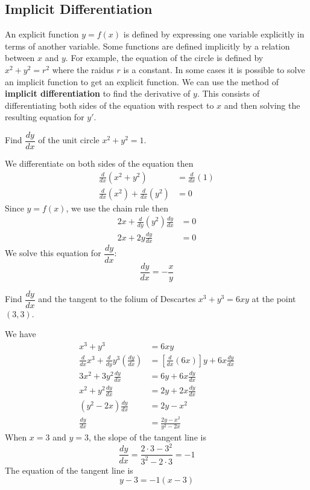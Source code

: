 \subsection{Implicit Differentiation}

An explicit function \(y=f(x)\) is defined by expressing one variable
explicitly in terms of another variable.
Some functions are defined implicitly by a relation between \(x\) and \(y\).
For example, the equation of the circle is defined by \(x^2+y^2=r^2\)
where the raidus \(r\) is a constant.
In some cases it is possible to solve an implicit function to get an explicit function.
We can use the method of \textbf{implicit differentiation} to find the derivative
of \(y\).
This consists of differentiating both sides of the equation with respect to
\(x\) and then solving the resulting equation for \(y'\).
\begin{problem}
    Find \(\dfrac{dy}{dx}\) of the unit circle \(x^2+y^2=1\).
\end{problem}
\begin{solution}
    We differentiate on both sides of the equation then
    \begin{align*}
        \frac{d}{dx}(x^2+y^2) &= \frac{d}{dx}(1) \\
        \frac{d}{dx}(x^2)+\frac{d}{dx}(y^2) &= 0
    \end{align*}
    Since \(y=f(x)\), we use the chain rule then
    \begin{align*}
        2x+\frac{d}{dy}(y^2)\frac{dy}{dx} &= 0 \\
        2x+2y\frac{dy}{dx} &= 0
    \end{align*}
    We solve this equation for \(\dfrac{dy}{dx}\):
    \[\frac{dy}{dx}=-\frac{x}{y}\]
\end{solution}
\begin{problem}
    Find \(\dfrac{dy}{dx}\) and the tangent to the folium of Descartes \(x^3+y^3=6xy\)
    at the point \((3,3)\).
\end{problem}
\begin{solution}
    We have
    \begin{align*}
        x^3+y^3 &= 6xy \\
        \frac{d}{dx}x^3+\frac{d}{dy}y^3\left(\frac{dy}{dx}\right)
        &= \left[\frac{d}{dx}(6x)\right]y+6x\frac{dy}{dx} \\
        3x^2+3y^2\frac{dy}{dx} &= 6y+6x\frac{dy}{dx} \\
        x^2+y^2\frac{dy}{dx} &= 2y+2x\frac{dy}{dx} \\
        (y^2-2x)\frac{dy}{dx} &= 2y-x^2 \\
        \frac{dy}{dx} &= \frac{2y-x^2}{y^2-2x} 
    \end{align*}
    When \(x=3\) and \(y=3\), the slope of the tangent line is
    \[\frac{dy}{dx}=\frac{2\cdot 3-3^2}{3^2-2\cdot 3}=-1\]
    The equation of the tangent line is
    \[y-3=-1(x-3)\]
\end{solution}
